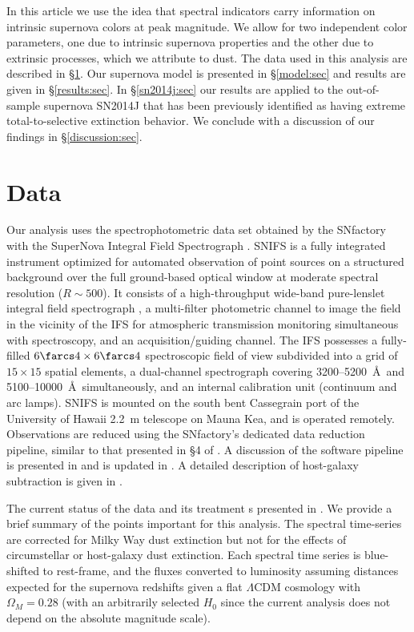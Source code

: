 \documentclass{aastex}   	%
\begin{document}
In this article we use the idea that spectral indicators carry information on intrinsic supernova colors at peak magnitude.
We allow for two independent color parameters, one due to intrinsic supernova
properties and the other due to
extrinsic processes, which we attribute to dust.  The data used in this analysis are described in \S\ref{data:sec}.  Our supernova model is presented in
\S\ref{model:sec} and results are given in \S\ref{results:sec}.  In \S\ref{sn2014j:sec} our results are applied to the out-of-sample
supernova SN2014J that has been previously identified as having extreme total-to-selective extinction behavior.
We conclude with a discussion of our findings in \S\ref{discussion:sec}.


\section{Data}
\label{data:sec}

Our analysis uses the spectrophotometric data set obtained by
the SNfactory with the SuperNova Integral Field
Spectrograph \citep[SNIFS,][]{2004SPIE.5249..146L}.  SNIFS is a fully integrated
instrument optimized for automated observation of point sources on a
structured background over the full ground-based optical window at
moderate spectral resolution ($R \sim 500$).  It consists of a
high-throughput wide-band pure-lenslet integral field spectrograph
\citep[IFS, ``\`a la TIGER;''][]{1995A&AS..113..347B,2000ASPC..195..173B,2001MNRAS.326...23B}, a
multi-filter photometric channel to image the field in the vicinity of
the IFS for atmospheric transmission monitoring simultaneous with
spectroscopy, and an acquisition/guiding channel.  The IFS possesses a
fully-filled $6\farcs 4 \times 6\farcs 4$ spectroscopic field of view
subdivided into a grid of $15 \times 15$ spatial elements, a
dual-channel spectrograph covering 3200--5200~\AA\ and 5100--10000~\AA\
simultaneously, and an internal calibration unit (continuum and arc
lamps).  SNIFS is mounted on the south bent Cassegrain port of the
University of Hawaii 2.2~m telescope on Mauna Kea, and is operated
remotely.  Observations are reduced using the SNfactory's dedicated data
reduction pipeline, similar to that presented in \S4 of \citet{2001MNRAS.326...23B}.
A discussion of the software pipeline is presented in
\citet{2006ApJ...650..510A} and is updated in \citet{2010ApJ...713.1073S}.  A detailed
description of host-galaxy subtraction is given in \citet{2011MNRAS.418..258B}.

The current status of the data and its treatment s presented in \citet{2015ApJ...815...58F}.
We provide a brief summary of the points important for this analysis.
The spectral time-series  are corrected for Milky Way dust
extinction \citep{1989ApJ...345..245C,1998ApJ...500..525S} but not for the
effects of circumstellar or host-galaxy dust extinction.  
Each spectral time series is
blue-shifted to rest-frame, and the fluxes converted to luminosity assuming
distances expected for the supernova redshifts given a flat
$\Lambda$CDM cosmology with $\Omega_M = 0.28$ (with an arbitrarily selected
$H_0$ since the current analysis does not depend on the absolute magnitude scale).
\end{document}
